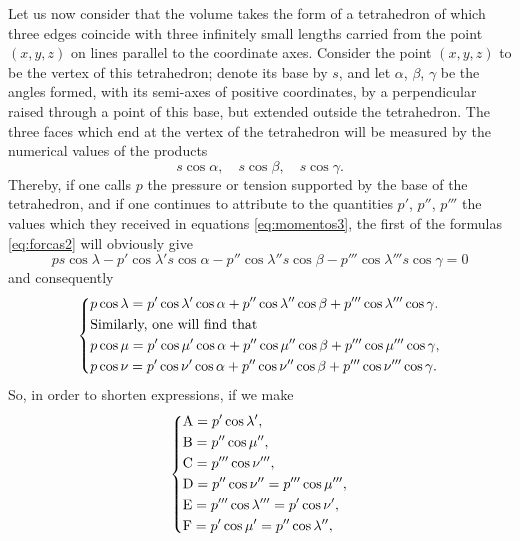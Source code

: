 \documentclass[leqno,openright,smallroyalvopaper,8pt,twoside,showtrims]{memoir}
\begin{document}
Let us now consider that the volume takes the form of a tetrahedron of which three edges coincide with three infinitely small lengths carried from the point $(x, y, z)$ on lines parallel to the coordinate axes. Consider the point $(x, y, z)$ to be the vertex of this tetrahedron; denote its base by $s$, and let $\alpha$, $\beta$, $\gamma$ be the angles formed, with its semi-axes of positive coordinates, by a perpendicular raised through a point of this base, but extended outside the tetrahedron. The three faces which end at the vertex of the tetrahedron will be measured by the numerical values of the products
\begin{equation}
s\cos\alpha,\quad s\cos\beta,\quad s\cos\gamma.
\end{equation}
Thereby, if one calls $p$ the pressure or tension supported by the base of the tetrahedron, and if one continues to attribute to the quantities $p'$, $p''$, $p'''$ the values which they received in equations \eqref{eq:momentos3}, the first of the formulas \eqref{eq:forcas2} will obviously give
\begin{equation*}
ps\cos\lambda-p'\cos\lambda's\cos\alpha-p''\cos\lambda''s\cos\beta-p'''\cos\lambda'''s\cos\gamma = 0
\end{equation*}
and consequently
\begin{equation}
   \begin{dcases}
   p\cos\lambda = p'\cos\lambda'\cos\alpha+p''\cos\lambda''\cos\beta+p'''\cos\lambda'''\cos\gamma.\\
\text{Similarly, one will find that}\\
p\cos\mu = p'\cos\mu'\cos\alpha+p''\cos\mu''\cos\beta+p'''\cos\mu'''\cos\gamma,\\
p\cos\nu = p'\cos\nu'\cos\alpha+p''\cos\nu''\cos\beta+p'''\cos\nu'''\cos\gamma.
    \end{dcases}
 \end{equation}
 So, in order to shorten expressions, if we make
 \begin{equation}
   \begin{dcases}
   \text{A} = p'\cos\lambda',\\
   \text{B} = p''\cos\mu'',\\
   \text{C} = p'''\cos\nu''',\\
    \text{D} = p''\cos\nu''=p'''\cos\mu''',\\  
    \text{E} = p'''\cos\lambda'''=p'\cos\nu',\\ 
    \text{F} = p'\cos\mu'=p''\cos\lambda'',\\ 
    \end{dcases}
 \end{equation}
\end{document}
